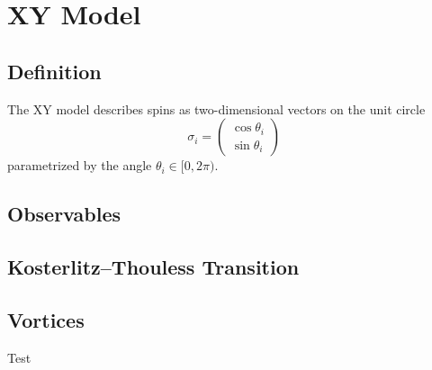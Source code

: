 \section{XY Model}
	\subsection{Definition}
		The XY model describes spins as two-dimensional vectors on the unit circle
		\begin{equation}\label{eq:hamiltonian}
			\sigma_i = \begin{pmatrix}
				\cos{\theta_i} \\ \sin{\theta_i}
			\end{pmatrix}
		\end{equation}
		parametrized by the angle $\theta_i \in [0,2\pi)$. 
		
	\subsection{Observables}
	
	\subsection{Kosterlitz–Thouless Transition}
	
	\subsection{Vortices}
	Test